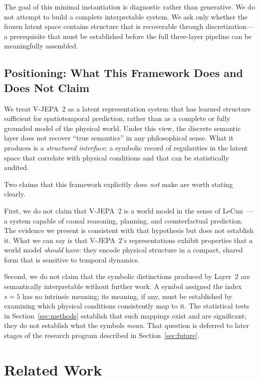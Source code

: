 \documentclass{article}
\begin{document}
The goal of this minimal instantiation is diagnostic rather than
generative.
We do not attempt to build a complete interpretable system.
We ask only whether the frozen latent space contains structure that is
recoverable through discretization---a prerequisite that must be
established before the full three-layer pipeline can be meaningfully
assembled.

\subsection{Positioning: What This Framework Does and Does Not Claim}
\label{sec:positioning}

We treat V-JEPA~2 as a latent representation system that has learned
structure sufficient for spatiotemporal prediction, rather than as a
complete or fully grounded model of the physical world.
Under this view, the discrete semantic layer does not recover
``true semantics'' in any philosophical sense.
What it produces is a \emph{structured interface}: a symbolic record
of regularities in the latent space that correlate with physical
conditions and that can be statistically audited.

Two claims that this framework explicitly does \emph{not} make are
worth stating clearly.

First, we do not claim that V-JEPA~2 is a world model in the sense
of LeCun~\cite{lecun2022path}---a system capable of causal reasoning,
planning, and counterfactual prediction.
The evidence we present is consistent with that hypothesis but does
not establish it.
What we can say is that V-JEPA~2's representations exhibit properties
that a world model \emph{should} have: they encode physical structure
in a compact, shared form that is sensitive to temporal dynamics.

Second, we do not claim that the symbolic distinctions produced by
Layer~2 are semantically interpretable without further work.
A symbol assigned the index $s = 5$ has no intrinsic meaning; its
meaning, if any, must be established by examining which physical
conditions consistently map to it.
The statistical tests in Section~\ref{sec:methods} establish that
such mappings exist and are significant; they do not establish what
the symbols \emph{mean}.
That question is deferred to later stages of the research program
described in Section~\ref{sec:future}.


\section{Related Work}
\label{sec:related}
\end{document}
